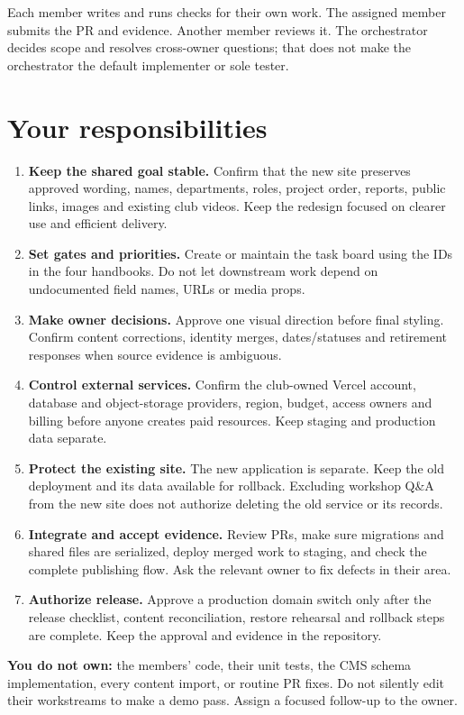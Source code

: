 \documentclass[11pt]{article}
\begin{document}
Each member writes and runs checks for their own work. The assigned member submits the PR and evidence. Another member reviews it. The orchestrator decides scope and resolves cross-owner questions; that does not make the orchestrator the default implementer or sole tester.

\section{Your responsibilities}
\begin{enumerate}
\item \textbf{Keep the shared goal stable.} Confirm that the new site preserves approved wording, names, departments, roles, project order, reports, public links, images and existing club videos. Keep the redesign focused on clearer use and efficient delivery.
\item \textbf{Set gates and priorities.} Create or maintain the task board using the IDs in the four handbooks. Do not let downstream work depend on undocumented field names, URLs or media props.
\item \textbf{Make owner decisions.} Approve one visual direction before final styling. Confirm content corrections, identity merges, dates/statuses and retirement responses when source evidence is ambiguous.
\item \textbf{Control external services.} Confirm the club-owned Vercel account, database and object-storage providers, region, budget, access owners and billing before anyone creates paid resources. Keep staging and production data separate.
\item \textbf{Protect the existing site.} The new application is separate. Keep the old deployment and its data available for rollback. Excluding workshop Q\&A from the new site does not authorize deleting the old service or its records.
\item \textbf{Integrate and accept evidence.} Review PRs, make sure migrations and shared files are serialized, deploy merged work to staging, and check the complete publishing flow. Ask the relevant owner to fix defects in their area.
\item \textbf{Authorize release.} Approve a production domain switch only after the release checklist, content reconciliation, restore rehearsal and rollback steps are complete. Keep the approval and evidence in the repository.
\end{enumerate}

\textbf{You do not own:} the members' code, their unit tests, the CMS schema implementation, every content import, or routine PR fixes. Do not silently edit their workstreams to make a demo pass. Assign a focused follow-up to the owner.
\end{document}
